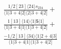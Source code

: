 \documentclass[varwidth, border=5pt]{standalone}
\begin{document}
\begin{my}
$\begin{gathered}
\scriptscriptstyle\frac{1/2[23]⟨24⟩s_{234}}{⟨1|3+4|2]⟨2|3+4|2]} +\\
\scriptscriptstyle\frac{1[13]⟨14⟩⟨1|𝟓|1]}{⟨1|3+4|1]⟨1|3+4|2]} +\\
\scriptscriptstyle\frac{-1/2[13]⟨34⟩⟨1|2+4|3]}{⟨1|3+4|1]⟨1|3+4|2]} \phantom{+}
\end{gathered}$
\end{my}
\end{document}
